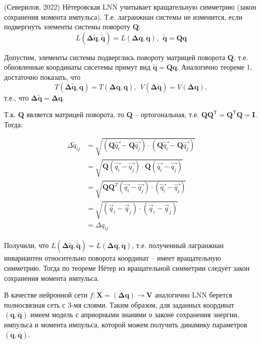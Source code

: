 \documentclass[12pt]{article}
\begin{document}
\begin{Theorem} (Северилов, 2022)
	Нётеровская LNN учитывает вращательную симметрию (закон сохранения момента импульса). Т.е. лагранжиан системы не изменится, если подвергнуть элементы системы повороту $\mathbf{Q}$: 
	$$L(\mathbf{\Delta \tilde{q}} , \mathbf{{\dot{\tilde{q}}}} ) = L(\mathbf{\Delta q}, \mathbf{\dot{q}}),~~ \mathbf{ \tilde{q}} = \mathbf{Q}\mathbf{ q}$$
\end{Theorem}
\begin{Proof}
	Допустим, элементы системы подверглись повороту матрицей поворота $\mathbf{Q}$, т.е. обновленные координаты сисетемы примут вид $\mathbf{\tilde{q}} = \mathbf{Q}\mathbf{q}$.
	Аналогично теореме 1, достаточно показать, что $$T(\mathbf{\Delta \tilde{q}}, \mathbf{\dot{q}}) = T(\mathbf{\Delta q}, \mathbf{\dot{q}}),~~ V(\mathbf{\Delta \tilde{q}}) = V(\mathbf{\Delta q}),$$
	т.е., что $\mathbf{\Delta \tilde{q}} = \mathbf{\Delta q}$.
	
	Т.к. $\mathbf{Q}$ является матрицей поворота, то $\mathbf{Q}$ -- ортогональная, т.е. $\mathbf{Q}\mathbf{Q}^\mathsf{T} = \mathbf{Q}^\mathsf{T}\mathbf{Q} = \mathbf{I}$. Тогда:
	
	$$\begin{aligned} 
	\Delta\tilde{q}_{i j}
	&=\sqrt{\left(\mathbf{Q} \vec{q_{i}}-\mathbf{Q} \vec{q_{j}}\right) \cdot\left(\mathbf{Q} \vec{q_{i}}-\mathbf{Q} \vec{q_{j}}\right)} \\&=\sqrt{\mathbf{Q}\left(\vec{q_{i}}-\vec{q_{j}}\right) \cdot \mathbf{Q}\left(\vec{q_{i}}-\vec{q_{j}}\right)} 
	\\&=\sqrt{\mathbf{Q} \mathbf{Q}^{T}\left(\vec{q_{i}}-\vec{q_{j}}\right) \cdot\left(\vec{q_{i}}-\vec{q_{j}}\right)} 
	\\&=\sqrt{\left(\vec{q}_{i}-\vec{q}_{j}\right) \cdot\left(\vec{q}_{i}-\vec{q}_{j}\right)} 
	\\&=\Delta q_{i j}
	\end{aligned}$$
	
	Получили, что $L(\mathbf{\Delta \tilde{q}}, \mathbf{\dot{\tilde{q}}}) = L(\mathbf{\Delta q}, \mathbf{\dot{q}})$, т.е. полученный лагранжиан инвариантен относительно поворота координат -- имеет вращательную симметрию. Тогда по теореме Нётер из вращательной симметрии следует закон сохранения момента импульса.
\end{Proof}

В качестве нейронной сети $f: \mathbf{X} = (\mathbf{\Delta q}) \rightarrow \mathbf{V}$ аналогично LNN берется полносвязная сеть с 3-мя слоями. Таким образом, для заданных координат  $(\mathbf{q}, \mathbf{\dot{q}})$ имеем модель с априорными знанями о законе сохранения энергии, импульса и момента импульса, которой можем получить динамику параметров $(\mathbf{\dot{q}}, \mathbf{\ddot{q}})$. 
\end{document}
